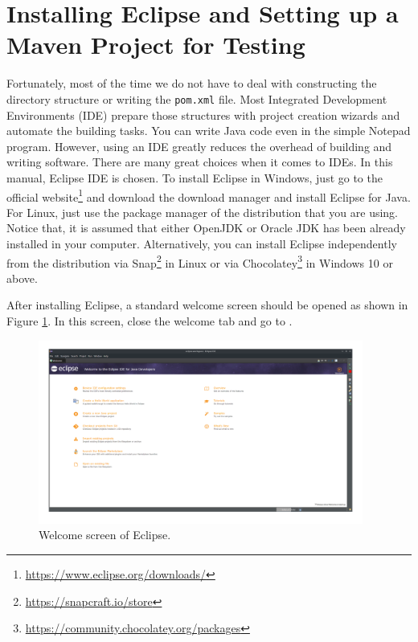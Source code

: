 \section{Installing Eclipse and Setting up a Maven Project for Testing}
Fortunately, most of the time we do not have to deal with constructing the directory structure or writing the \lstinline[language={}]|pom.xml| file. Most Integrated Development Environments (IDE) prepare those structures with project creation wizards and automate the building tasks. You can write Java code even in the simple Notepad program. However, using an IDE greatly reduces the overhead of building and writing software. There are many great choices when it comes to IDEs. In this manual, Eclipse IDE is chosen. To install Eclipse in Windows, just go to the official website\footnote{\url{https://www.eclipse.org/downloads/}} and download the download manager and install Eclipse for Java. For Linux, just use the package manager of the distribution that you are using. Notice that, it is assumed that either OpenJDK or Oracle JDK has been already installed in your computer. Alternatively, you can install Eclipse independently from the distribution via Snap\footnote{\url{https://snapcraft.io/store}} in Linux or via Chocolatey\footnote{\url{https://community.chocolatey.org/packages}} in Windows 10 or above.

After installing Eclipse, a standard welcome screen should be opened as shown in Figure \ref{fig:eclipse-welcome}. In this screen, close the welcome tab and go to .

\begin{figure}[H]
    \centering
    \includegraphics[width=0.95\textwidth]{images/eclipse-welcome.png}
    \caption{Welcome screen of Eclipse.}
    \label{fig:eclipse-welcome}
\end{figure}

